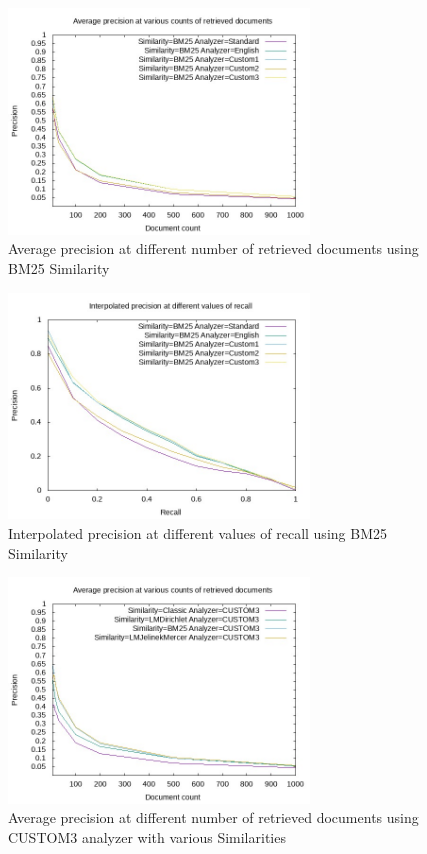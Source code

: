 \begin{figure}[!htbp]
  \centerline{\includegraphics[width=8cm, height=6cm]{images/avg_pre_bm25.jpg}}
  \vspace*{-3mm}
  \caption{Average precision at different number of retrieved documents using BM25 Similarity}
  \label{fig:exp1}
\end{figure}
\vspace*{-4mm}
\begin{figure}[!htbp]
  \centerline{\includegraphics[width=8cm, height=6cm]{images/pr_bm25.jpg}}
  \vspace*{-3mm}
  \caption{Interpolated precision at different values of recall using BM25 Similarity}
  \label{fig:exp2}
\end{figure}
\vspace*{-4mm}
\begin{figure}[!htbp]
  \centerline{\includegraphics[width=8cm, height=6cm]{images/avg_pre_cus3.jpg}}
  \vspace*{-3mm}
  \caption{Average precision at different number of retrieved documents using CUSTOM3 analyzer with various Similarities}
  \label{fig:exp3}
\end{figure}
